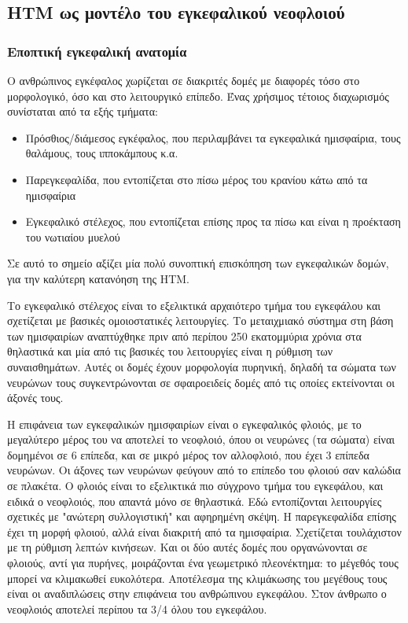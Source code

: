 \subsection{HTM ως μοντέλο του εγκεφαλικού νεοφλοιού}

\subsubsection{Εποπτική εγκεφαλική ανατομία}

  Ο ανθρώπινος εγκέφαλος χωρίζεται σε διακριτές δομές με διαφορές τόσο στο μορφολογικό, όσο και στο λειτουργικό επίπεδο.
  Ένας χρήσιμος τέτοιος διαχωρισμός συνίσταται από τα εξής τμήματα:
  \begin{itemize}
    \item Πρόσθιος/διάμεσος εγκέφαλος, που περιλαμβάνει τα εγκεφαλικά ημισφαίρια, τους θαλάμους, τους ιπποκάμπους κ.α.
    \item Παρεγκεφαλίδα, που εντοπίζεται στο πίσω μέρος του κρανίου κάτω από τα ημισφαίρια
    \item Εγκεφαλικό στέλεχος, που εντοπίζεται επίσης προς τα πίσω και είναι η προέκταση του νωτιαίου μυελού
  \end{itemize}

  Σε αυτό το σημείο αξίζει μία πολύ συνοπτική επισκόπηση των εγκεφαλικών δομών, για την καλύτερη κατανόηση της HTM.

  Το εγκεφαλικό στέλεχος είναι το εξελικτικά αρχαιότερο τμήμα του εγκεφάλου και σχετίζεται με βασικές ομοιοστατικές λειτουργίες.
  Το μεταιχμιακό σύστημα στη βάση των ημισφαιρίων αναπτύχθηκε πριν από περίπου 250 εκατομμύρια χρόνια στα θηλαστικά
  και μία από τις βασικές του λειτουργίες είναι η ρύθμιση των συναισθημάτων.
  Αυτές οι δομές έχουν μορφολογία πυρηνική, δηλαδή τα σώματα των νευρώνων τους συγκεντρώνονται σε σφαιροειδείς δομές
  από τις οποίες εκτείνονται οι άξονές τους.

  Η επιφάνεια των εγκεφαλικών ημισφαιρίων είναι ο εγκεφαλικός φλοιός, με το μεγαλύτερο μέρος του να αποτελεί το νεοφλοιό,
  όπου οι νευρώνες (τα σώματα) είναι δομημένοι σε 6 επίπεδα, και σε μικρό μέρος τον αλλοφλοιό, που έχει 3 επίπεδα νευρώνων.
  Οι άξονες των νευρώνων φεύγουν από το επίπεδο του φλοιού σαν καλώδια σε πλακέτα.
  Ο φλοιός είναι το εξελικτικά πιο σύγχρονο τμήμα του εγκεφάλου, και ειδικά ο νεοφλοιός, που απαντά μόνο σε θηλαστικά.
  Εδώ εντοπίζονται λειτουργίες σχετικές με "ανώτερη συλλογιστική" και αφηρημένη σκέψη.
  Η παρεγκεφαλίδα επίσης έχει τη μορφή φλοιού, αλλά είναι διακριτή από τα ημισφαίρια. Σχετίζεται τουλάχιστον με τη
  ρύθμιση λεπτών κινήσεων. Και οι δύο αυτές δομές που οργανώνονται σε φλοιούς, αντί για πυρήνες, μοιράζονται ένα
  γεωμετρικό πλεονέκτημα: το μέγεθός τους μπορεί να κλιμακωθεί ευκολότερα.
  Αποτέλεσμα της κλιμάκωσης του μεγέθους τους είναι οι αναδιπλώσεις στην επιφάνεια του ανθρώπινου εγκεφάλου.
  Στον άνθρωπο ο νεοφλοιός αποτελεί περίπου τα 3/4 όλου του εγκεφάλου.

